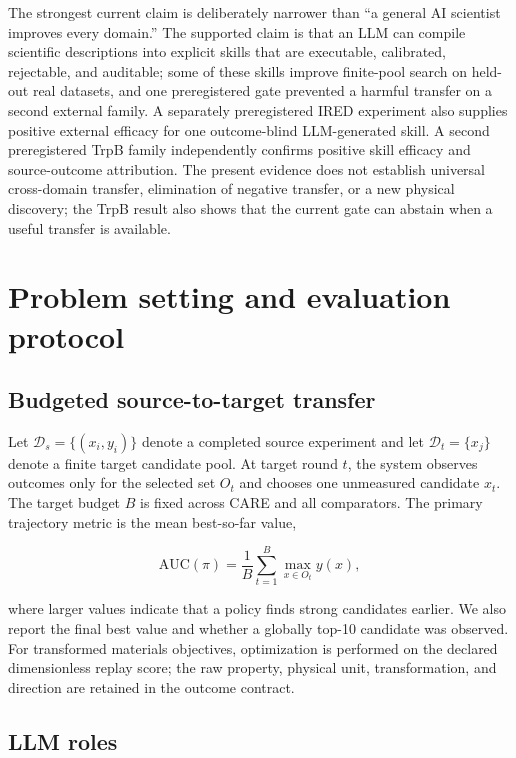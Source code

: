 \documentclass[pdflatex,sn-nature]{sn-jnl}
\newcommand{\source}{\mathcal{D}_{s}}
\newcommand{\target}{\mathcal{D}_{t}}
\begin{document}
\begin{appendices}
The strongest current claim is deliberately narrower than ``a general AI
scientist improves every domain.'' The supported claim is that an LLM can
compile scientific descriptions into explicit skills that are executable,
calibrated, rejectable, and auditable; some of these skills improve finite-pool
search on held-out real datasets, and one preregistered gate prevented a harmful
transfer on a second external family. A separately preregistered IRED experiment
also supplies positive external efficacy for one outcome-blind LLM-generated
skill. A second preregistered TrpB family independently confirms positive skill
efficacy and source-outcome attribution. The present evidence does not establish
universal cross-domain transfer, elimination of negative transfer, or a new
physical discovery; the TrpB result also shows that the current gate can abstain
when a useful transfer is available.

\section{Problem setting and evaluation protocol}
\label{sec:protocol}

\subsection{Budgeted source-to-target transfer}

Let $\source=\{(x_i,y_i)\}$ denote a completed source experiment and let
$\target=\{x_j\}$ denote a finite target candidate pool. At target round $t$,
the system observes outcomes only for the selected set $O_t$ and chooses one
unmeasured candidate $x_t$. The target budget $B$ is fixed across CARE and all
comparators. The primary trajectory metric is the mean best-so-far value,

\begin{equation}
  \mathrm{AUC}(\pi)=\frac{1}{B}\sum_{t=1}^{B}
  \max_{x\in O_t} y(x),
\end{equation}

where larger values indicate that a policy finds strong candidates earlier.
We also report the final best value and whether a globally top-10 candidate was
observed. For transformed materials objectives, optimization is performed on
the declared dimensionless replay score; the raw property, physical unit,
transformation, and direction are retained in the outcome contract.

\subsection{LLM roles}
\label{sec:llm_roles}


\end{appendices}
\end{document}
